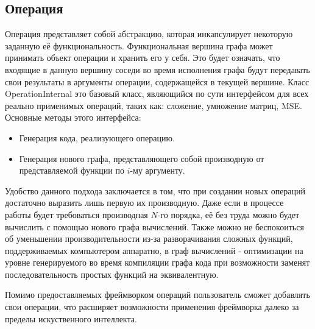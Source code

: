 \subsection{Операция}
Операция представляет собой абстракцию, которая инкапсулирует некоторую заданную её функциональность. Функциональная вершина графа может принимать объект операции и хранить его у себя. Это будет означать, что входящие в данную вершину соседи во время исполнения графа будут передавать свои результаты в аргументы операции, содержащейся в текущей вершине. Класс OperationInternal это базовый класс, являющийся по сути интерфейсом для всех реально применимых операций, таких как: сложение, умножение матриц, MSE. Основные методы этого интерфейса:
\begin{itemize} 
    \item Генерация кода, реализующего операцию.
    \item Генерация нового графа, представляющего собой производную от представляемой функции по $i$-му аргументу.
\end{itemize}
Удобство данного подхода заключается в том, что при создании новых операций достаточно выразить лишь первую их производную. Даже если в процессе работы будет требоваться производная $N$-го порядка, её без труда можно будет вычислить с помощью нового графа вычислений. Также можно не беспокоиться об уменьшении производительности из-за разворачивания сложных функций, поддерживаемых компьютером аппаратно, в граф вычислений - оптимизации на уровне генерируемого во время компиляции графа кода при возможности заменят последовательность простых функций на эквивалентную.
\par 
Помимо предоставляемых фреймворком операций пользователь сможет добавлять свои операции, что расширяет возможности применения фреймворка далеко за пределы искуственного интеллекта.

